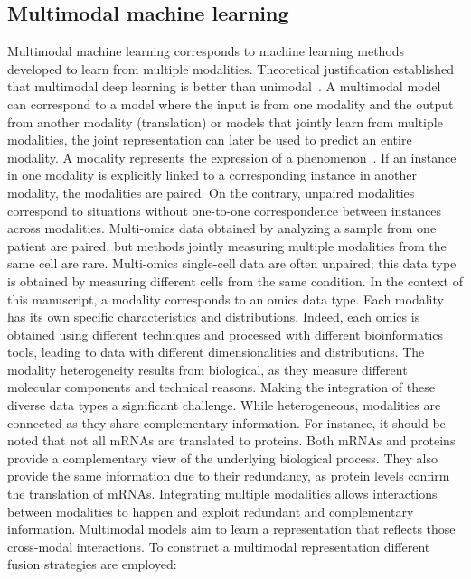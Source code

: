\documentclass[../main.tex]{subfiles}
\begin{document}
	\subsection{Multimodal machine learning}
		Multimodal machine learning corresponds to machine learning methods developed to learn from multiple modalities.
		Theoretical justification established that multimodal deep learning is better than unimodal~\cite{NEURIPS2021_5aa3405a}.
		A multimodal model can correspond to a model where the input is from one modality and the output from another modality (translation) or models that jointly learn from multiple modalities, the joint representation can later be used to predict an entire modality.
		A modality represents the expression of a phenomenon~\cite{MML_morency}.
		If an instance in one modality is explicitly linked to a corresponding instance in another modality, the modalities are paired.
		On the contrary, unpaired modalities correspond to situations without one-to-one correspondence between instances across modalities.
		Multi-omics data obtained by analyzing a sample from one patient are paired, but methods jointly measuring multiple modalities from the same cell are rare.
		Multi-omics single-cell data are often unpaired; this data type is obtained by measuring different cells from the same condition.
		In the context of this manuscript, a modality corresponds to an omics data type.
		Each modality has its own specific characteristics and distributions.
		Indeed, each omics is obtained using different techniques and processed with different bioinformatics tools, leading to data with different dimensionalities and distributions.
		The modality heterogeneity results from biological, as they measure different molecular components and technical reasons.
		Making the integration of these diverse data types a significant challenge.
		While heterogeneous, modalities are connected as they share complementary information.
		For instance, it should be noted that not all mRNAs are translated to proteins.
		Both mRNAs and proteins provide a complementary view of the underlying biological process.
		They also provide the same information due to their redundancy, as protein levels confirm the translation of mRNAs.
		Integrating multiple modalities allows interactions between modalities to happen and exploit redundant and complementary information.
		Multimodal models aim to learn a representation that reflects those cross-modal interactions.
		To construct a multimodal representation different fusion strategies are employed:
\end{document}
